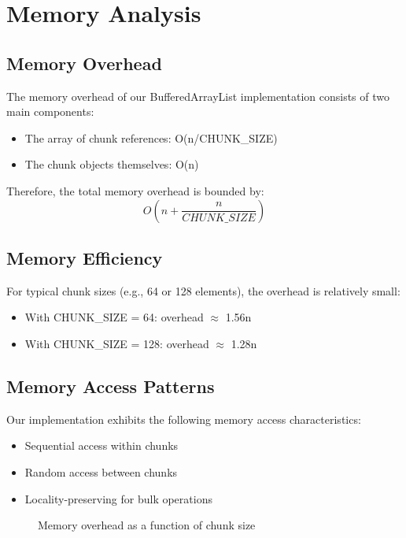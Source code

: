 \section{Memory Analysis}
\subsection{Memory Overhead}
The memory overhead of our BufferedArrayList implementation consists of two main components:
\begin{itemize}
    \item The array of chunk references: O(n/CHUNK\_SIZE)
    \item The chunk objects themselves: O(n)
\end{itemize}

Therefore, the total memory overhead is bounded by:
\begin{equation}
O(n + \frac{n}{CHUNK\_SIZE})
\end{equation}

\subsection{Memory Efficiency}
For typical chunk sizes (e.g., 64 or 128 elements), the overhead is relatively small:
\begin{itemize}
    \item With CHUNK\_SIZE = 64: overhead $\approx$ 1.56n
    \item With CHUNK\_SIZE = 128: overhead $\approx$ 1.28n
\end{itemize}

\subsection{Memory Access Patterns}
Our implementation exhibits the following memory access characteristics:
\begin{itemize}
    \item Sequential access within chunks
    \item Random access between chunks
    \item Locality-preserving for bulk operations
\end{itemize}

\begin{figure}[t]
\centering
{}
\caption{Memory overhead as a function of chunk size}
\label{fig:memory_overhead}
\end{figure} 